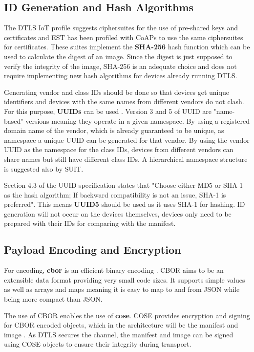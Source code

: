 \documentclass[0-thesis.tex]{subfiles}
\begin{document}
\subsection{ID Generation and Hash Algorithms}
\label{ssec:hash-id-algorithm}
The DTLS IoT profile suggests ciphersuites for the use of pre-shared keys and certificates
and EST has been profiled with CoAPs to use the same ciphersuites for certificates. These
suites implement the \textbf{SHA-256} hash function which can be used to calculate the
digest of an image. Since the digest is just supposed to verify the integrity of the
image, SHA-256 is an adequate choice and does not require implementing new hash algorithms
for devices already running DTLS.

Generating vendor and class IDs should be done so that devices get unique identifiers and
devices with the same names from different vendors do not clash. For this purpose,
\textbf{UUIDs} can be used \parencite{rfc4122}. Version 3 and 5 of UUID are "name-based"
versions meaning they operate in a given namespace. By using a registered domain name of
the vendor, which is already guaranteed to be unique, as namespace a unique UUID can be
generated for that vendor. By using the vendor UUID as the namespace for the class IDs,
devices from different vendors can share names but still have different class IDs. A
hierarchical namespace structure is suggested also by SUIT.

Section 4.3 of the UUID specification states that "Choose either MD5 or SHA-1 as the hash
algorithm; If backward compatibility is not an issue, SHA-1 is preferred". This means
\textbf{UUID5} should be used as it uses SHA-1 for hashing. ID generation will not occur on the
devices themselves, devices only need to be prepared with their IDs for comparing with the
manifest.

\subsection{Payload Encoding and Encryption}
\label{ssec:encoding-encryption}
For encoding, \textbf{\gls{cbor}} is an efficient binary encoding \parencite{rfc7049}.
CBOR aims to be an extensible data format providing very small code sizes. It supports
simple values as well as arrays and maps meaning it is easy to map to and from JSON while
being more compact than JSON. 

The use of CBOR enables the use of \textbf{\gls{cose}}. COSE provides encryption and signing for
CBOR encoded objects, which in the architecture will be the manifest and image
\parencite{rfc8152}. As DTLS secures the channel, the manifest and image can be signed
using COSE objects to ensure their integrity during transport. 
\end{document}
